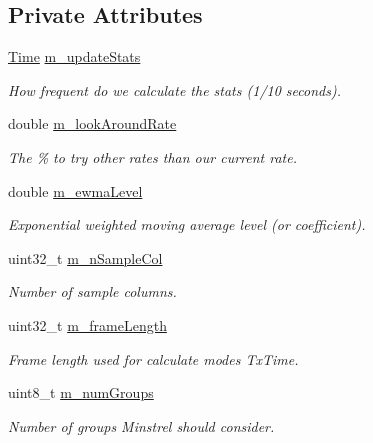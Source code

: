 \subsection*{Private Attributes}
\begin{DoxyCompactItemize}
\item 
\hyperlink{classns3_1_1Time}{Time} \hyperlink{classns3_1_1MinstrelHtWifiManager_a5c7d923b77d5cd3a1d38810ed41f91f8}{m\+\_\+update\+Stats}
\begin{DoxyCompactList}\small\item\em How frequent do we calculate the stats (1/10 seconds). \end{DoxyCompactList}\item 
double \hyperlink{classns3_1_1MinstrelHtWifiManager_a7db397626b2dff4bd62619aa7fec75af}{m\+\_\+look\+Around\+Rate}
\begin{DoxyCompactList}\small\item\em The \% to try other rates than our current rate. \end{DoxyCompactList}\item 
double \hyperlink{classns3_1_1MinstrelHtWifiManager_ace0a340f6c702f416f3dc9fed71105d1}{m\+\_\+ewma\+Level}
\begin{DoxyCompactList}\small\item\em Exponential weighted moving average level (or coefficient). \end{DoxyCompactList}\item 
uint32\+\_\+t \hyperlink{classns3_1_1MinstrelHtWifiManager_afc2db9ea273b3599cb09ccbf73f866e0}{m\+\_\+n\+Sample\+Col}
\begin{DoxyCompactList}\small\item\em Number of sample columns. \end{DoxyCompactList}\item 
uint32\+\_\+t \hyperlink{classns3_1_1MinstrelHtWifiManager_a069e6a4b77dc080d720a4b076cd8d7c5}{m\+\_\+frame\+Length}
\begin{DoxyCompactList}\small\item\em Frame length used for calculate modes Tx\+Time. \end{DoxyCompactList}\item 
uint8\+\_\+t \hyperlink{classns3_1_1MinstrelHtWifiManager_a8a0964148ee665bab466b2858e8094b7}{m\+\_\+num\+Groups}
\begin{DoxyCompactList}\small\item\em Number of groups Minstrel should consider. \end{DoxyCompactList}\item 

\end{DoxyCompactItemize}
